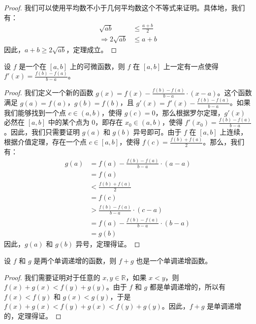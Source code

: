 \begin{proof}
  我们可以使用平均数不小于几何平均数这个不等式来证明。具体地，我们有：
  \begin{align*}
    \sqrt{ab}              & \leq \frac{a+b}{2} \\
    \Rightarrow 2\sqrt{ab} & \leq a+b
  \end{align*}
  因此，$a+b \geq 2\sqrt{ab}$，定理成立。
\end{proof}

\begin{lem}
  设 $f$ 是一个在 $[a,b]$ 上的可微函数，则 $f$ 在 $[a,b]$ 上一定有一点使得 $f'(x) = \frac{f(b)-f(a)}{b-a}$。
\end{lem}

\begin{proof}
  我们定义一个新的函数 $g(x) = f(x) - \frac{f(b)-f(a)}{b-a} \cdot (x-a)$。这个函数满足 $g(a) = f(a)$，$g(b) = f(b)$，且 $g'(x) = f'(x) - \frac{f(b)-f(a)}{b-a}$。如果我们能够找到一个点 $c \in (a,b)$，使得 $g(c) = 0$，那么根据罗尔定理，$g'(x)$ 必然在 $[a,b]$ 中的某个点为 $0$，即存在 $x_0 \in (a,b)$，使得 $f'(x_0) = \frac{f(b)-f(a)}{b-a}$。因此，我们只需要证明 $g(a)$ 和 $g(b)$ 异号即可。由于 $f$ 在 $[a,b]$ 上连续，根据介值定理，存在一个点 $c \in [a,b]$，使得 $f(c) = \frac{f(b)+f(a)}{2}$。那么，我们有：
  \begin{align*}
    g(a) & = f(a) - \frac{f(b)-f(a)}{b-a} \cdot (a-a) \\
         & = f(a)                                     \\
         & < \frac{f(b)+f(a)}{2}                      \\
         & = f(c)                                     \\
         & > \frac{f(b)-f(a)}{b-a} \cdot (c-a)        \\
         & = f(a) - \frac{f(b)-f(a)}{b-a} \cdot (b-a) \\
         & = g(b)
  \end{align*}
  因此，$g(a)$ 和 $g(b)$ 异号，定理得证。
\end{proof}

\begin{prop}
  设 $f$ 和 $g$ 是两个单调递增的函数，则 $f+g$ 也是一个单调递增函数。
\end{prop}

\begin{proof}
  我们需要证明对于任意的 $x,y \in \mathbb{R}$，如果 $x < y$，则 $f(x)+g(x) < f(y)+g(y)$。由于 $f$ 和 $g$ 都是单调递增的，所以有 $f(x) < f(y)$ 和 $g(x) < g(y)$，于是 $f(x)+g(x) < f(y)+g(x) < f(y)+g(y)$。因此，$f+g$ 是单调递增的，定理得证。
\end{proof}

